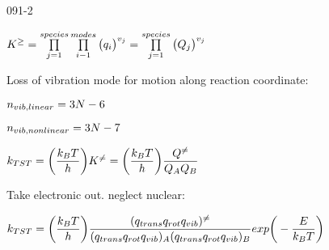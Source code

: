 \begin{mitframe}{091-2}
\begin{listone}
	\item $\dilfac^{\geq}=\prod\limits_{j=1}^{species}\prod\limits_{\state-1}^{modes}\big(\heatflux_{\state}\big)^{\vvel_j}=\prod\limits_{j=1}^{species}\big(\heatflow_j\big)^{\vvel_j}$
    	\begin{listtwo}
        	\item Loss of vibration mode for motion along reaction coordinate:
        	\begin{listthree}
            	\item $n_{vib,linear}=3\nummoles-6$
                \item $n_{vib,nonlinear}=3\nummoles-7$
            \end{listthree}
			\item $\thermcond_{TST}=\bigg(\dfrac{\thermcond_{\exergy}\Temp}{\heattranscoeff}\bigg)\dilfac^{\neq}=\bigg(\dfrac{\thermcond_{\exergy}\Temp}{\heattranscoeff}\bigg)\dfrac{\heatflow^{\neq}}{\heatflow_{\helmholtz}\heatflow_{\exergy}}$
            \begin{listthree}
            	\item Take electronic out. neglect nuclear:
                \item $\thermcond_{TST}=\bigg(\dfrac{\thermcond_{\exergy}\Temp}{\heattranscoeff}\bigg)\dfrac{(\tmpc\rmpc\vmpc)^{\neq}}{(\tmpc\rmpc\vmpc)_{\helmholtz}(\tmpc\rmpc\vmpc)_{\exergy}}exp\bigg(-\dfrac{\energy}{\thermcond_{\exergy}\Temp}\bigg)$
                
            \end{listthree}
        \end{listtwo}
    
\end{listone}        
\end{mitframe}